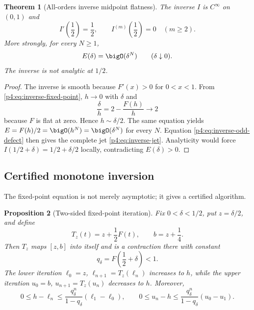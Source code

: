 \documentclass[11pt]{article}
\numberwithin{equation}{section}
\newtheorem{theorem}{Theorem}[section]
\newtheorem{proposition}[theorem]{Proposition}
\theoremstyle{definition}
\theoremstyle{remark}
\begin{document}
\begin{theorem}[All-orders inverse midpoint flatness]
\label{p4:thm:inverse-flatness}
The inverse $I$ is $C^\infty$ on $(0,1)$ and
\begin{equation}
 I'\!\left(\frac12\right)=\frac12,
 \qquad I^{(m)}\!\left(\frac12\right)=0\quad(m\ge2).
 \label{p4:eq:inverse-jet}
\end{equation}
More strongly, for every $N\ge1$,
\begin{equation}
 E(\delta)=\bigO(\delta^N)\qquad(\delta\downarrow0).
 \label{p4:eq:E-flat}
\end{equation}
The inverse is not analytic at $1/2$.
\end{theorem}

\begin{proof}
The inverse is smooth because $F'(x)>0$ for $0<x<1$.  From \eqref{p4:eq:inverse-fixed-point}, $h\to0$ with $\delta$ and
\[
 \frac\delta h=2-\frac{F(h)}h\longrightarrow2
\]
because $F$ is flat at zero.  Hence $h\sim\delta/2$.  The same equation yields
$E=F(h)/2=\bigO(h^N)=\bigO(\delta^N)$ for every $N$.  Equation \eqref{p4:eq:inverse-odd-defect} then gives the complete jet \eqref{p4:eq:inverse-jet}.  Analyticity would force $I(1/2+\delta)=1/2+\delta/2$ locally, contradicting $E(\delta)>0$.
\end{proof}

\subsection{Certified monotone inversion}
The fixed-point equation is not merely asymptotic; it gives a certified algorithm.

\begin{proposition}[Two-sided fixed-point iteration]
\label{p4:prop:certified-iteration}
Fix $0<\delta<1/2$, put $z=\delta/2$, and define
\[
 T_z(t)=z+\frac12F(t),
 \qquad b=z+\frac14.
\]
Then $T_z$ maps $[z,b]$ into itself and is a contraction there with constant
\begin{equation}
 q_\delta=F\!\left(\frac12+\delta\right)<1.
 \label{p4:eq:qdelta}
\end{equation}
The lower iteration $\ell_0=z$, $\ell_{n+1}=T_z(\ell_n)$ increases to $h$, while the upper iteration $u_0=b$, $u_{n+1}=T_z(u_n)$ decreases to $h$.  Moreover,
\begin{equation}
 0\le h-\ell_n\le\frac{q_\delta^n}{1-q_\delta}(\ell_1-\ell_0),
 \qquad
 0\le u_n-h\le\frac{q_\delta^n}{1-q_\delta}(u_0-u_1).
 \label{p4:eq:iteration-errors}
\end{equation}
\end{proposition}
\end{document}
